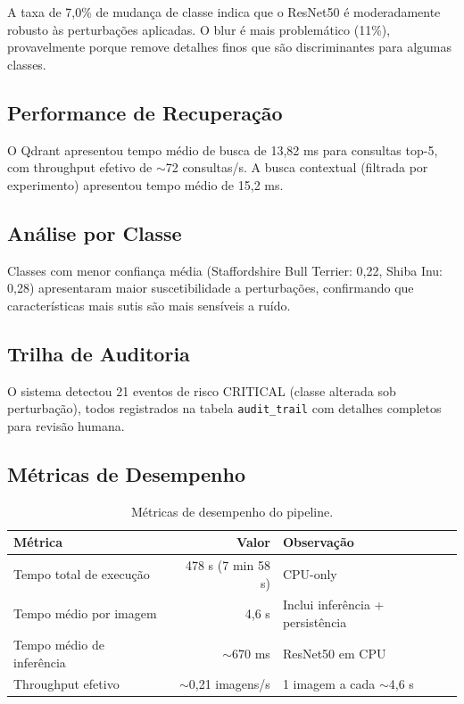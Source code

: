 \documentclass[12pt,a4paper,twoside]{article}
\begin{document}
A taxa de 7,0\% de mudança de classe indica que o ResNet50 é moderadamente robusto às perturbações aplicadas. O blur é mais problemático (11\%), provavelmente porque remove detalhes finos que são discriminantes para algumas classes.

\subsection{Performance de Recuperação}

O Qdrant apresentou tempo médio de busca de 13,82 ms para consultas top-5, com throughput efetivo de $\sim$72 consultas/s. A busca contextual (filtrada por experimento) apresentou tempo médio de 15,2 ms.

\subsection{Análise por Classe}

Classes com menor confiança média (Staffordshire Bull Terrier: 0,22, Shiba Inu: 0,28) apresentaram maior suscetibilidade a perturbações, confirmando que características mais sutis são mais sensíveis a ruído.

\subsection{Trilha de Auditoria}

O sistema detectou 21 eventos de risco CRITICAL (classe alterada sob perturbação), todos registrados na tabela \texttt{audit\_trail} com detalhes completos para revisão humana.

\subsection{Métricas de Desempenho}

\begin{table}[H]
\centering
\caption{Métricas de desempenho do pipeline.}
\label{tab:desempenho}
\begin{tabular}{@{}lrl@{}}
\toprule
\textbf{Métrica} & \textbf{Valor} & \textbf{Observação} \\
\midrule
Tempo total de execução & 478 s (7 min 58 s) & CPU-only \\
Tempo médio por imagem & 4,6 s & Inclui inferência + persistência \\
Tempo médio de inferência & $\sim$670 ms & ResNet50 em CPU \\
Throughput efetivo & $\sim$0,21 imagens/s & 1 imagem a cada $\sim$4,6 s \\
\bottomrule
\end{tabular}
\end{table}
\end{document}
